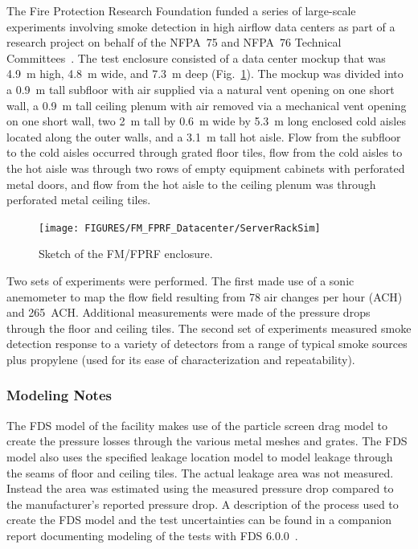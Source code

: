 The Fire Protection Research Foundation funded a series of large-scale experiments involving smoke detection in high airflow data centers as part of a research project on behalf of the NFPA~75 and NFPA~76 Technical Committees~\cite{FM_Datacenter_Rpt}. The test enclosure consisted of a data center mockup that was 4.9~m high, 4.8~m wide, and 7.3~m deep (Fig.~\ref{ServerRackSim_Sketch}). The mockup was divided into a 0.9~m tall subfloor with air supplied via a natural vent opening on one short wall, a 0.9~m tall ceiling plenum with air removed via a mechanical vent opening on one short wall, two 2~m tall by 0.6~m wide by 5.3~m long enclosed cold aisles located along the outer walls, and a 3.1~m tall hot aisle. Flow from the subfloor to the cold aisles occurred through grated floor tiles, flow from the cold aisles to the hot aisle was through two rows of empty equipment cabinets with perforated metal doors, and flow from the hot aisle to the ceiling plenum was through perforated metal ceiling tiles.

\begin{figure}[!ht]
\texttt{[image: FIGURES/FM\_FPRF\_Datacenter/ServerRackSim]}
\caption[Sketch of the FM/FPRF enclosure]{Sketch of the FM/FPRF enclosure.}
\label{ServerRackSim_Sketch}
\end{figure}

Two sets of experiments were performed. The first made use of a sonic anemometer to map the flow field resulting from 78 air changes per hour (ACH) and 265~ACH. Additional measurements were made of the pressure drops through the floor and ceiling tiles. The second set of experiments measured smoke detection response to a variety of detectors from a range of typical smoke sources plus propylene (used for its ease of characterization and repeatability).

\subsubsection{Modeling Notes}

The FDS model of the facility makes use of the particle screen drag model to create the pressure losses through the various metal meshes and grates. The FDS model also uses the specified leakage location model to model leakage through the seams of floor and ceiling tiles. The actual leakage area was not measured. Instead the area was estimated using the measured pressure drop compared to the manufacturer's reported pressure drop. A description of the process used to create the FDS model and the test uncertainties can be found in a companion report documenting modeling of the tests with FDS 6.0.0~\cite{FDS_Datacenter_Rpt}.


